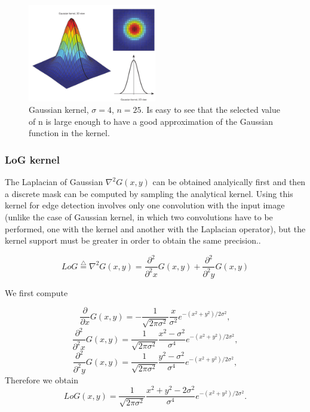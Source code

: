 \documentclass{ipol}
\numberwithin{equation}{section}
\numberwithin{table}{section}
\begin{document}
\begin{figure}
	\centering
	\includegraphics[width=0.5\textwidth]{kernel_gaussian.pdf}
	\caption{Gaussian kernel, $\sigma=4$, $n=25$. Is easy to see that the selected value of n is 
large enough to have a good approximation of the Gaussian function in the kernel.}
	\label{fig:gaussian_kernel}
\end{figure}


\subsubsection{LoG kernel}

The Laplacian of Gaussian $\nabla^2G(x,y)$ can be obtained analyically first and then a discrete mask 
can be computed by sampling the analytical kernel. Using this kernel for edge detection involves only 
one convolution with the input image (unlike the case of Gaussian kernel, in which two convolutions 
have to be performed, one with the kernel and another with the Laplacian operator), but the kernel 
support must be greater in order to obtain the same precision..


\begin{equation}
	LoG \stackrel{\triangle}{=}\nabla^2G(x,y)=\frac{\partial^2}{\partial^2 x}G(x,y) + \frac{\partial^2}{\partial^2 y}G(x,y)
\end{equation}

We first compute

\begin{equation} 
	\frac{\partial}{\partial x}G(x,y)=-\frac{1}{\sqrt{2\pi\sigma^2}}\frac{x}{\sigma^2}e^{-(x^2+y^2)/2\sigma^2},
\end{equation}
\begin{equation} 
	\frac{\partial^2}{\partial^2 x}G(x,y)=\frac{1}{\sqrt{2\pi\sigma^2}}\frac{x^2-\sigma^2}{\sigma^4}e^{-(x^2+y^2)/2\sigma^2},
\end{equation}
\begin{equation} 
	\frac{\partial^2}{\partial^2 y}G(x,y)=\frac{1}{\sqrt{2\pi\sigma^2}}\frac{y^2-\sigma^2}{\sigma^4}e^{-(x^2+y^2)/2\sigma^2},
\end{equation}
Therefore we obtain
\begin{equation}
	\label{eq:log_function}
	LoG(x,y)=\frac{1}{\sqrt{2\pi\sigma^2}}\frac{x^2+y^2-2\sigma^2}{\sigma^4}e^{-(x^2+y^2)/2\sigma^2}.
\end{equation}\\
\end{document}
